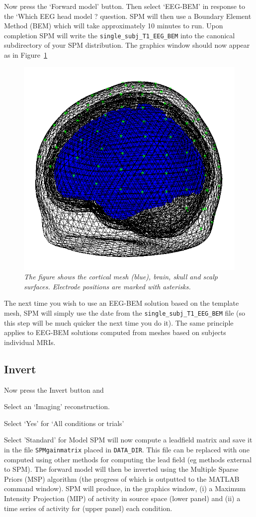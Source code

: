 Now press the `Forward model' button. Then select `EEG-BEM' in response to the `Which EEG head model ? question. SPM will then use a Boundary Element Method (BEM) which will take approximately 10 minutes to run. Upon completion SPM will write the \texttt{single\_subj\_T1\_EEG\_BEM} into the canonical subdirectory of your SPM distribution. The graphics window should now appear as in Figure~\ref{forward}
\begin{figure}
\begin{center}
\includegraphics[width=120mm]{mmn/forward}
\caption{\em
\label{mesh}The figure shows the cortical mesh (blue), brain, skull and scalp surfaces. Electrode positions are marked with asterisks.
\label{forward}}
\end{center}
\end{figure}
The next time you wish to use an EEG-BEM solution based on the template mesh, SPM will simply use the date from the \texttt{single\_subj\_T1\_EEG\_BEM} file (so this step will be much quicker the next time you do it). The same principle applies to EEG-BEM solutions computed from meshes based on subjects individual MRIs.

\subsection{Invert}

Now press the Invert button and
\bi
\item{Select an `Imaging' reconstruction.}
\item{Select `Yes' for `All conditions or trials'}
\item{Select 'Standard' for Model}
\ei
SPM will now compute a leadfield matrix and save it in the file
\texttt{SPMgainmatrix} placed in \texttt{DATA\_DIR}. This file can be replaced with one computed using other methods for computing the lead field (eg methods external to SPM). The forward model will then be inverted using the Multiple Sparse Priors (MSP) algorithm (the progress of which is outputted to the MATLAB command window). SPM will produce, in the graphics window, (i) a Maximum Intensity Projection (MIP) of activity in source space (lower panel) and (ii) a time series of activity for (upper panel) each condition.

